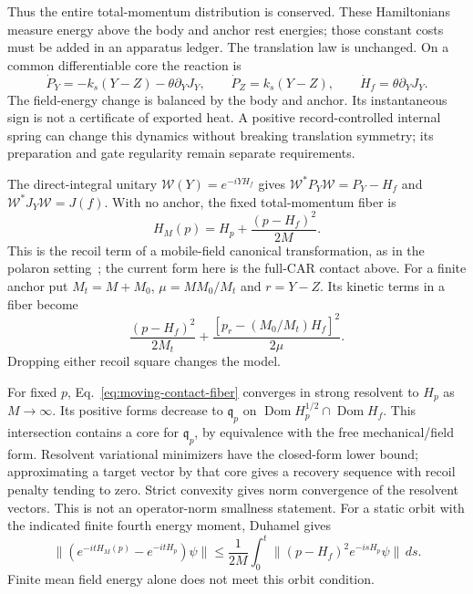 Thus the entire total-momentum distribution is conserved.
These Hamiltonians measure energy above the body and anchor rest
energies; those constant costs must be added in an apparatus ledger.
The translation law is unchanged. On a common
differentiable core the reaction is
\[
 \dot P_Y=-k_s(Y-Z)-\theta\partial_YJ_Y,\qquad
 \dot P_Z=k_s(Y-Z),\qquad \dot H_f=\theta\partial_YJ_Y.
\]
The field-energy change is balanced by the body and anchor. Its
instantaneous sign is not a certificate of exported heat. A positive
record-controlled internal spring can change this dynamics without
breaking translation symmetry; its preparation and gate regularity
remain separate requirements.

The direct-integral unitary $\mathcal W(Y)=e^{-iYH_f}$ gives
$\mathcal W^*P_Y\mathcal W=P_Y-H_f$ and
$\mathcal W^*J_Y\mathcal W=J(f)$. With no anchor, the fixed
total-momentum fiber is
\begin{equation}\label{eq:moving-contact-fiber}
 H_M(p)=H_p+\frac{(p-H_f)^2}{2M}.
\end{equation}
This is the recoil term of a mobile-field canonical transformation,
as in the polaron setting~\cite{LeeLowPines1953}; the current form
here is the full-CAR contact above. For a finite anchor put
$M_t=M+M_0$, $\mu=MM_0/M_t$ and $r=Y-Z$. Its kinetic terms
in a fiber become
\[
 \frac{(p-H_f)^2}{2M_t}
 +\frac{[p_r-(M_0/M_t)H_f]^2}{2\mu}.
\]
Dropping either recoil square changes the model.

For fixed $p$, Eq.~\eqref{eq:moving-contact-fiber} converges in
strong resolvent to $H_p$ as $M\to\infty$. Its positive forms
decrease to $\mathfrak q_p$ on
$\operatorname{Dom}H_p^{1/2}\cap\operatorname{Dom}H_f$.
This intersection contains a core for $\mathfrak q_p$, by equivalence
with the free mechanical/field form. Resolvent variational minimizers
have the closed-form lower bound; approximating a target vector by
that core gives a recovery sequence with recoil penalty tending to
zero. Strict convexity gives norm convergence of the resolvent vectors.
This is not an operator-norm smallness statement. For a static orbit
with the indicated finite fourth energy moment, Duhamel gives
\[
 \|(e^{-itH_M(p)}-e^{-itH_p})\psi\|
 \le\frac1{2M}\int_0^t
       \|(p-H_f)^2e^{-isH_p}\psi\|\,ds.
\]
Finite mean field energy alone does not meet this orbit condition.

